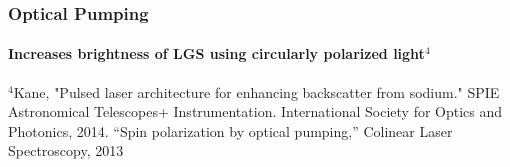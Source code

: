 \documentclass{beamer}
\begin{document}
\begin{frame}
  \frametitle{Optical Pumping}
  \framesubtitle{Increases brightness of LGS using circularly polarized light$^{4}$}
  \centering
  \begin{figure}
  \end{figure}
{\tiny $^4$Kane, "Pulsed laser architecture for enhancing backscatter from sodium." SPIE Astronomical Telescopes+ Instrumentation. International Society for Optics and Photonics, 2014.}
{\tiny ``Spin polarization by optical pumping,'' Colinear Laser Spectroscopy, 2013}
 
\end{frame}
\end{document}
